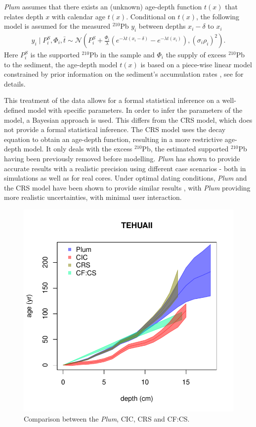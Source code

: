\documentclass [10pt] {article}
\begin{document}
\textit{Plum} assumes that there exists an (unknown) age-depth function $t(x)$ that relates depth $x$ with calendar age $t(x)$. 
Conditional on $t(x)$, the following model is assumed for the measured $^{210}$Pb $y_i$ between depths $x_i - \delta$ to $x_i$
\begin{eqnarray}
y_i\mid P^S_i, \Phi_i, \bar{t}\sim \mathcal{N} \left(P^S_i+\frac{\Phi_i}{\lambda} \left( e^{-\lambda t(x_i-\delta)} - e^{-\lambda t(x_i)} \right), (\sigma_i\rho_i)^2 \right). 
\end{eqnarray}
Here $P_i^S$ is the supported $^{210}$Pb in the sample and $\Phi_i$ the supply of excess $^{210}$Pb to the sediment, the age-depth model $t(x)$ is based on a piece-wise linear model constrained by prior information on the sediment's accumulation rates  \citep{Blaauw2011}, see \citep{Aquino2018} for details.

This treatment of the data allows for a formal statistical inference on a well-defined model with specific parameters. 
In order to infer the parameters of the model, a Bayesian approach is used.
This differs from the CRS model, which does not provide a formal statistical inference.
The CRS model uses the decay equation to obtain an age-depth function, resulting in a more restrictive age-depth model. 
It only deals with the excess $^{210}$Pb, the estimated supported $^{210}$Pb having been previously removed before modelling.
\textit{Plum} has shown to provide accurate results with a realistic precision using different case scenarios \citep{Aquino2018,Aquino2020} - both in simulations as well as for real cores.
Under optimal dating conditions, \textit{Plum} and the CRS model have been shown to provide similar results \citep{Aquino2020}, with \textit{Plum} providing more realistic uncertainties, with minimal user interaction.

\begin{figure}[h!]
 \centering
	\includegraphics[width=.75\linewidth]{TEHUAII.pdf}
	\caption{Comparison between the \textit{Plum}, CIC, CRS and CF:CS.} 
  \label{fig:tehuaii}
\end{figure}
\end{document}
